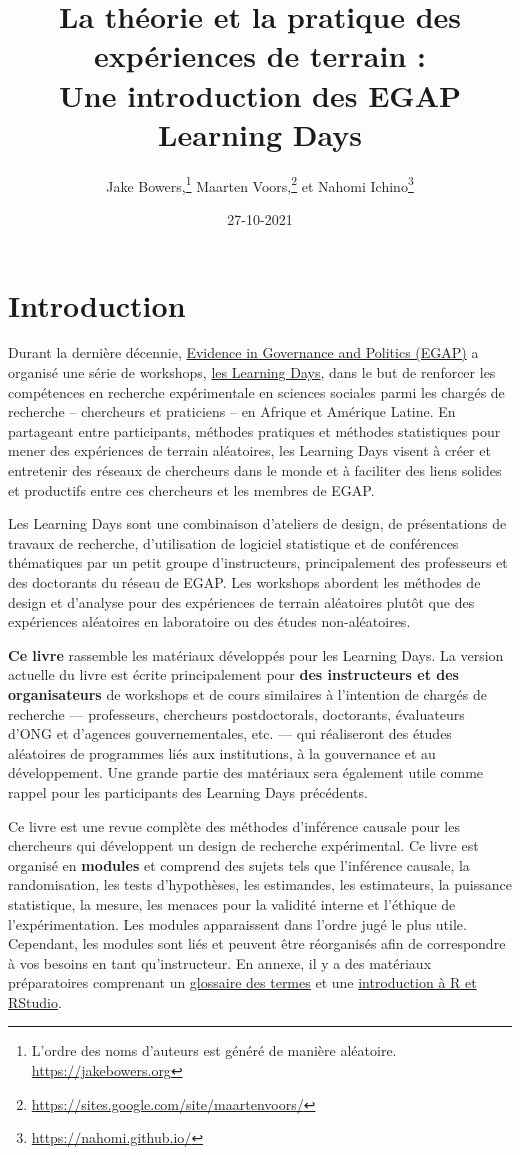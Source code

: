 \documentclass[
  12pt,
]{book}
\title{La théorie et la pratique des expériences de terrain :\\
Une introduction des EGAP Learning Days}
\author{Jake Bowers,\footnote{L'ordre des noms d'auteurs est généré de manière aléatoire. \url{https://jakebowers.org}} Maarten Voors,\footnote{\url{https://sites.google.com/site/maartenvoors/}} et Nahomi Ichino\footnote{\url{https://nahomi.github.io/}}}
\date{27-10-2021}
\begin{document}
\maketitle

\captionsetup[table]{list=no}
\captionsetup[figure]{list=no}

{
\hypersetup{linkcolor=}
\setcounter{tocdepth}{1}
\tableofcontents
}
\hypertarget{introduction}{%
\chapter{Introduction}\label{introduction}}

Durant la dernière décennie, \href{https://egap.org/}{Evidence in Governance and Politics (EGAP)} a organisé une série de workshops, \href{https://egap.org/learning-days/}{les Learning Days}, dans le but de renforcer les compétences en recherche expérimentale en sciences sociales parmi les chargés de recherche -- chercheurs et praticiens -- en Afrique et Amérique Latine. En partageant entre participants, méthodes pratiques et méthodes statistiques pour mener des expériences de terrain aléatoires, les Learning Days visent à créer et entretenir des réseaux de chercheurs dans le monde et à faciliter des liens solides et productifs entre ces chercheurs et les membres de EGAP.

Les Learning Days sont une combinaison d'ateliers de design, de présentations de travaux de recherche, d'utilisation de logiciel statistique et de conférences thématiques par un petit groupe d'instructeurs, principalement des professeurs et des doctorants du réseau de EGAP. Les workshops abordent les méthodes de design et d'analyse pour des expériences de terrain aléatoires plutôt que des expériences aléatoires en laboratoire ou des études non-aléatoires.

\textbf{Ce livre} rassemble les matériaux développés pour les Learning Days. La version actuelle du livre est écrite principalement pour \textbf{des instructeurs et des organisateurs} de workshops et de cours similaires à l'intention de chargés de recherche --- professeurs, chercheurs postdoctorals, doctorants, évaluateurs d'ONG et d'agences gouvernementales, etc. --- qui réaliseront des études aléatoires de programmes liés aux institutions, à la gouvernance et au développement. Une grande partie des matériaux sera également utile comme rappel pour les participants des Learning Days précédents.

Ce livre est une revue complète des méthodes d'inférence causale pour les chercheurs qui développent un design de recherche expérimental. Ce livre est organisé en \textbf{modules} et comprend des sujets tels que l'inférence causale, la randomisation, les tests d'hypothèses, les estimandes, les estimateurs, la puissance statistique, la mesure, les menaces pour la validité interne et l'éthique de l'expérimentation. Les modules apparaissent dans l'ordre jugé le plus utile. Cependant, les modules sont liés et peuvent être réorganisés afin de correspondre à vos besoins en tant qu'instructeur. En annexe, il y a des matériaux préparatoires comprenant un \href{glossary-of-terms.html}{glossaire des termes} et une \href{introduction-to-r-and-rstudio.html}{introduction à R et RStudio}.
\end{document}
